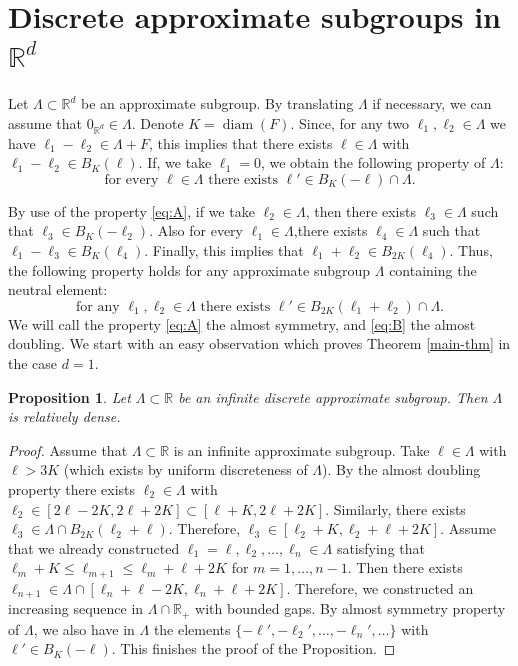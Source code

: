 \documentclass[JEP,XML,SOM,Unicode,NoEqCountersInSection]{cedram}
\DeclareMathOperator{\diam}{diam}
\newcommand{\bR}{\mathbb{R}}
\newcounter{dummy} \numberwithin{dummy}{section}
\theoremstyle{plain}
\newtheorem{prop}[dummy]{Proposition}
\theoremstyle{definition}
\begin{document}
\section{Discrete approximate subgroups in \texorpdfstring{$\bR^d$}{Rd}}

Let $\Lambda \subset \bR^d$ be an approximate subgroup. By translating $\Lambda$ if necessary, we can assume that $0_{\bR^d} \in \Lambda$.
Denote $K = \diam(F)$. Since, for any two $\ell_1,\ell_2 \in \Lambda$ we have $\ell_1 - \ell_2 \in \Lambda + F$, this implies that there exists $\ell \in \Lambda$ with $\ell_1 - \ell_2 \in B_K(\ell)$. If, we take $\ell_1 = 0$, we obtain the following property of $\Lambda$:
\begin{equation}\label{eq:A}
\tag{A} \text{for every $\ell \in \Lambda$ there exists $\ell' \in B_{K}(-\ell) \cap \Lambda$.}
\end{equation}

By use of the property \eqref{eq:A}, if we take $ \ell_2 \in \Lambda$, then there exists $\ell_3 \in \Lambda$ such that $\ell_3 \in B_K(-\ell_2)$. Also for every $\ell_1 \in \Lambda$,there exists $\ell_4 \in \Lambda$ such that $\ell_1 - \ell_3 \in B_K(\ell_4)$. Finally, this implies that $\ell_1 + \ell_2 \in B_{2K}(\ell_4)$. Thus, the following property holds for any approximate subgroup $\Lambda$ containing the neutral element:
\begin{equation}\label{eq:B}
\tag{B} \text{for any $\ell_1, \ell_2 \in \Lambda$ there exists $\ell' \in B_{2K}(\ell_1 + \ell_2) \cap \Lambda$.}
\end{equation}
We will call the property \eqref{eq:A} the almost symmetry, and \eqref{eq:B} the almost doubling.
We start with an easy observation which proves Theorem \ref{main-thm} in the case $d=1$.

\begin{prop}\label{simple-prop}
Let $\Lambda \subset \bR$ be an infinite discrete approximate subgroup. Then $\Lambda$ is relatively dense.
\end{prop}
\begin{proof}
Assume that $\Lambda \subset \bR$ is an infinite approximate subgroup. Take $\ell \in \Lambda$ with $\ell > 3K$ (which exists by uniform discreteness of $\Lambda$). By the almost doubling property there exists $\ell_2 \in \Lambda$ with $\ell_2 \in [2\ell-2K, 2 \ell + 2K] \subset [\ell + K, 2 \ell+2K]$. Similarly, there exists $\ell_3 \in \Lambda \cap B_{2K}(\ell_2 + \ell)$. Therefore, $\ell_3 \in [\ell_2+K, \ell_2 + \ell + 2K]$. Assume that we already constructed $\ell_1 = \ell, \ell_2,\ldots,\ell_{n} \in \Lambda$ satisfying that $\ell_m + K \leq \ell_{m+1} \leq \ell_m + \ell + 2K$ for $m=1,\ldots,n-1 $. Then there exists $\ell_{n+1} \in \Lambda \cap [\ell_n + \ell - 2K, \ell_n + \ell + 2K]$. Therefore, we constructed an increasing sequence in $\Lambda \cap \bR_{+}$ with bounded gaps. By almost symmetry property of $\Lambda$, we also have in $\Lambda$ the elements $\{-\ell',-\ell_2',\ldots,-\ell_n',\ldots\}$ with $\ell' \in B_{K}(-\ell)$. This finishes the proof of the Proposition.
\end{proof}
\end{document}
